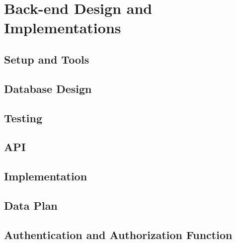 \chapter{Back-end Design and Implementations}
\label{sec:sec03}


\section{Setup and Tools}
\label{subsubsec:dbsetup}


\section{Database Design}
\label{subsubsec:Database Design}


\section{Testing}
\label{subsubsec:dbtesting}
%

\section{API}
\label{subsubsec:dbdesign}


\section{Implementation}
\label{subsubsec:dbimplementation}


\section{Data Plan}
\label{subsubsec:dbdataplan}
%

\section{Authentication and Authorization Function}
\label{sec:sec03}
